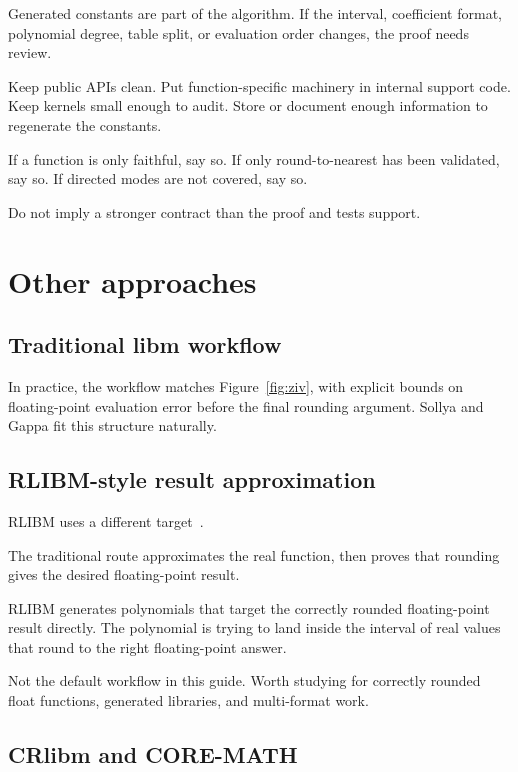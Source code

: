 \documentclass[manuscript, nonacm]{acmart}
\begin{document}
  Generated constants are part of the algorithm. If the interval, coefficient
  format, polynomial degree, table split, or evaluation order changes, the
  proof needs review.

  Keep public APIs clean. Put function-specific machinery in internal support
  code. Keep kernels small enough to audit. Store or document enough
  information to regenerate the constants.

  If a function is only faithful, say so. If only round-to-nearest has been
  validated, say so. If directed modes are not covered, say so.

  Do not imply a stronger contract than the proof and tests support.



  \section{Other approaches}

  \subsection{Traditional libm workflow}

  In practice, the workflow matches Figure~\ref{fig:ziv}, with explicit bounds
  on floating-point evaluation error before the final rounding argument. Sollya
  and Gappa fit this structure naturally.

  \subsection{RLIBM-style result approximation}

  RLIBM uses a different target~\cite{rlibm}.

  The traditional route approximates the real function, then proves that
  rounding gives the desired floating-point result.

  RLIBM generates polynomials that target the correctly rounded floating-point
  result directly. The polynomial is trying to land inside the interval of
  real values that round to the right floating-point answer.

  Not the default workflow in this guide. Worth studying for correctly
  rounded float functions, generated libraries, and multi-format work.

  \subsection{CRlibm and CORE-MATH}
\end{document}
